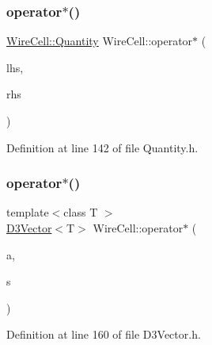 \subsubsection{\texorpdfstring{operator$\ast$()}{operator*()}\hspace{0.1cm}{\footnotesize\ttfamily [1/3]}}
{\footnotesize\ttfamily \hyperlink{class_wire_cell_1_1_quantity}{Wire\+Cell\+::\+Quantity} Wire\+Cell\+::operator$\ast$ (\begin{DoxyParamCaption}\item[{const \hyperlink{class_wire_cell_1_1_quantity}{Wire\+Cell\+::\+Quantity} \&}]{lhs,  }\item[{const \hyperlink{class_wire_cell_1_1_quantity}{Wire\+Cell\+::\+Quantity} \&}]{rhs }\end{DoxyParamCaption})\hspace{0.3cm}{\ttfamily [inline]}}



Definition at line 142 of file Quantity.\+h.

\mbox{\label{namespace_wire_cell_a5d9245915d1907fcf860d6e9000c8ba6}} 
\subsubsection{\texorpdfstring{operator$\ast$()}{operator*()}\hspace{0.1cm}{\footnotesize\ttfamily [2/3]}}
{\footnotesize\ttfamily template$<$class T $>$ \\
\hyperlink{class_wire_cell_1_1_d3_vector}{D3\+Vector}$<$T$>$ Wire\+Cell\+::operator$\ast$ (\begin{DoxyParamCaption}\item[{const \hyperlink{class_wire_cell_1_1_d3_vector}{D3\+Vector}$<$ T $>$}]{a,  }\item[{T}]{s }\end{DoxyParamCaption})}



Definition at line 160 of file D3\+Vector.\+h.

\mbox{\label{namespace_wire_cell_a11f3548ef97b8c9fa535c1a32937b9e2}} 

